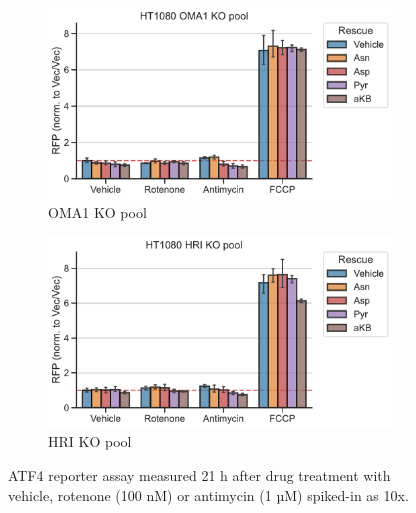 \begin{figure}[!ht]
     \centering
     \begin{subfigure}[b]{0.49\textwidth}
         \includegraphics[width=\textwidth]{figures/sapp/ISR/ATF4rep_OMA1pool.pdf}
         \caption{OMA1 KO pool}
         \label{fig:sapp:ISR:ATF4rep_OMA1pool}
     \end{subfigure}
     \hfill
     \begin{subfigure}[b]{0.49\textwidth}
         \includegraphics[width=\textwidth]{figures/sapp/ISR/ATF4rep_HRIpool.pdf}
         \caption{HRI KO pool}
         \label{fig:sapp:ISR:ATF4rep_HRIpool}
     \end{subfigure}
     \hfill
        \caption[ATF4 post mito inhib. OMA1/HRI KO, reporter]{
        ATF4 reporter assay measured 21 h after drug treatment with vehicle, rotenone (100 nM) or antimycin (1 µM) spiked-in as 10x.
        }
        \label{fig:sapp:ISR:ATF4rep_OMA1_HRIpool}
\end{figure}

